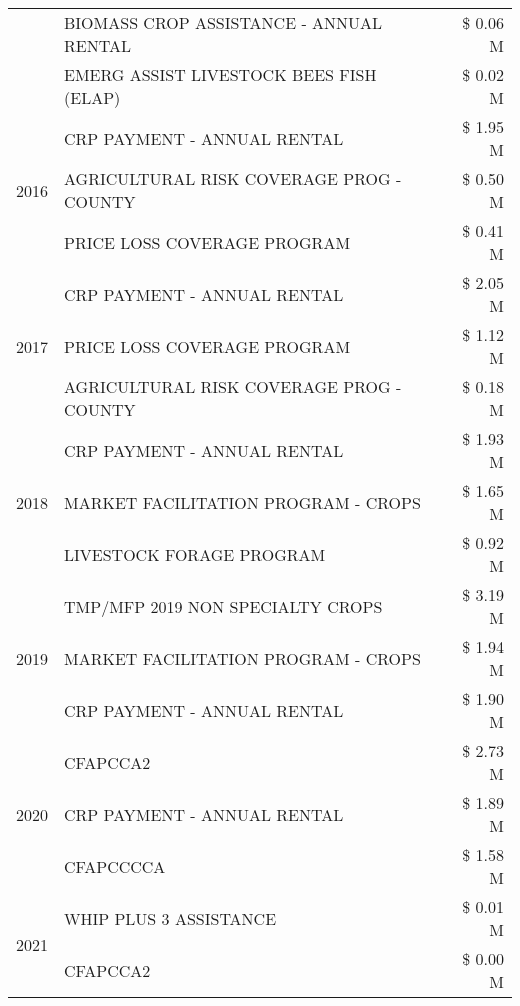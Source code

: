 \begin{tabular}{llr}
 & BIOMASS CROP ASSISTANCE - ANNUAL RENTAL & \$ 0.06 M \\
 & EMERG ASSIST LIVESTOCK BEES FISH (ELAP) & \$ 0.02 M \\
\cline{1-3}
\multirow[t]{3}{*}{2016} & CRP PAYMENT - ANNUAL RENTAL & \$ 1.95 M \\
 & AGRICULTURAL RISK COVERAGE PROG - COUNTY & \$ 0.50 M \\
 & PRICE LOSS COVERAGE PROGRAM & \$ 0.41 M \\
\cline{1-3}
\multirow[t]{3}{*}{2017} & CRP PAYMENT - ANNUAL RENTAL & \$ 2.05 M \\
 & PRICE LOSS COVERAGE PROGRAM & \$ 1.12 M \\
 & AGRICULTURAL RISK COVERAGE PROG - COUNTY & \$ 0.18 M \\
\cline{1-3}
\multirow[t]{3}{*}{2018} & CRP PAYMENT - ANNUAL RENTAL & \$ 1.93 M \\
 & MARKET FACILITATION PROGRAM - CROPS & \$ 1.65 M \\
 & LIVESTOCK FORAGE PROGRAM & \$ 0.92 M \\
\cline{1-3}
\multirow[t]{3}{*}{2019} & TMP/MFP 2019 NON SPECIALTY CROPS & \$ 3.19 M \\
 & MARKET FACILITATION PROGRAM - CROPS & \$ 1.94 M \\
 & CRP PAYMENT - ANNUAL RENTAL & \$ 1.90 M \\
\cline{1-3}
\multirow[t]{3}{*}{2020} & CFAPCCA2 & \$ 2.73 M \\
 & CRP PAYMENT - ANNUAL RENTAL & \$ 1.89 M \\
 & CFAPCCCCA & \$ 1.58 M \\
\cline{1-3}
\multirow[t]{2}{*}{2021} & WHIP PLUS 3 ASSISTANCE & \$ 0.01 M \\
 & CFAPCCA2 & \$ 0.00 M \\
\cline{1-3}
\bottomrule
\end{tabular}
